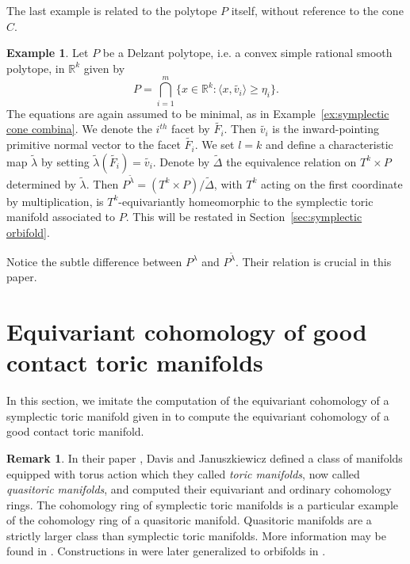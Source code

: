 \documentclass[12pt]{amsart}
\theoremstyle{definition}
\newtheorem{example}[theorem]{Example}
\newtheorem{remark}[theorem]{Remark}
\numberwithin{equation}{section}
\begin{document}
The last example is related to the polytope $P$ itself, without
reference to the cone $C$.
\begin{example}\label{ex:sym orb combinatorics}
Let $P$ be a Delzant polytope, i.e. a convex simple rational smooth
polytope, in ${{\mathbb{R}}}^{k}$ given by
\begin{equation}\label{eq:simple polytope}
P = \bigcap_{i=1}^{m}\{x\in {{\mathbb{R}}}^k: \langle x, \tilde{v_{i}}\rangle
\geq \eta_{i}\}.\end{equation} The equations are again assumed to be
minimal, as in Example~\ref{ex:symplectic cone combina}. We denote
the $i^{th}$ facet by $\tilde{F_{i}}$. Then $\tilde{v_{i}}$ is the
inward-pointing primitive normal vector to the facet
$\tilde{F_{i}}$. We set $l=k$ and define a characteristic map
$\tilde{\lambda}$ by setting $\tilde{\lambda}(\tilde{F_{i}})=
\tilde{v_{i}}$. Denote by $\tilde{\Delta}$ the equivalence relation
on $T^k\times P$ determined by $\tilde{\lambda}$. Then
$P^{\tilde{\lambda}}=(T^k\times P)/\tilde{\Delta}$, with $T^k$
acting on the first coordinate by multiplication, is
$T^{k}$-equivariantly homeomorphic to the symplectic toric manifold
associated to $P$. This will be restated in
Section~\ref{sec:symplectic orbifold}.
\end{example}
Notice the subtle difference between $P^{\lambda}$ and
$P^{\tilde{\lambda}}$. Their relation is crucial in this paper.

\section{\bf Equivariant cohomology of good contact toric manifolds}\label{sec:equi contact}
In this section, we imitate the computation of the equivariant
cohomology of a symplectic toric manifold given in \cite{DJ} to
compute the equivariant cohomology of a good contact toric manifold.

\begin{remark}
In their paper \cite{DJ}, Davis and Januszkiewicz defined a class of
manifolds equipped with torus action which they called {\em toric
manifolds}, now called {\em quasitoric manifolds}, and computed
their equivariant and ordinary cohomology rings. The cohomology ring
of symplectic toric manifolds is a particular example of the
cohomology ring of a quasitoric manifold. Quasitoric manifolds are a
strictly larger class than symplectic toric manifolds. More
information may be found in \cite{GP:quasitoric}. Constructions in
\cite{DJ} were later generalized to orbifolds in \cite{PS:quasitoric
orbifolds}.
\end{remark}
\end{document}

